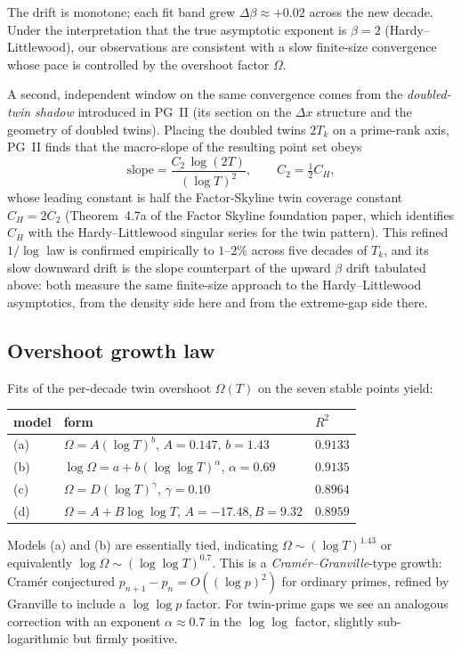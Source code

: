\documentclass[11pt]{article}
\begin{document}
The drift is monotone; each fit band grew $\Delta\beta\approx+0.02$
across the new decade. Under the interpretation that the true
asymptotic exponent is $\beta=2$ (Hardy--Littlewood), our observations
are consistent with a slow finite-size convergence whose pace is
controlled by the overshoot factor
$\Omega$.

A second, independent window on the same convergence comes from the
\emph{doubled-twin shadow} introduced in PG~II (its section on the
$\Delta x$ structure and the geometry of doubled twins). Placing the
doubled twins $2T_k$ on a prime-rank axis, PG~II finds that the
macro-slope of the resulting point set obeys
\[
   \mathrm{slope}=\frac{C_2\,\log(2T)}{(\log T)^2},
   \qquad C_2=\tfrac12 C_H,
\]
whose leading constant is half the Factor-Skyline twin coverage
constant $C_H=2C_2$ (Theorem~4.7a of the Factor Skyline foundation
paper, which identifies $C_H$ with the Hardy--Littlewood singular
series for the twin pattern). This refined $1/\log$ law is confirmed
empirically to $1$--$2\%$ across five decades of $T_k$, and its slow
downward drift is the slope counterpart of the upward $\beta$ drift
tabulated above: both measure the same finite-size approach to the
Hardy--Littlewood asymptotics, from the density side here and from the
extreme-gap side there.

\subsection{Overshoot growth law}

Fits of the per-decade twin overshoot
$\Omega(T)$ on the seven stable points yield:
\begin{center}
\begin{tabular}{lll}
\toprule
model & form & $R^2$ \\
\midrule
(a) & $\Omega=A(\log T)^b$, $A=0.147,\,b=1.43$ & $0.9133$ \\
(b) & $\log\Omega=a+b(\log\log T)^\alpha$, $\alpha=0.69$ & $0.9135$ \\
(c) & $\Omega=D(\log T)^\gamma$, $\gamma=0.10$ & $0.8964$ \\
(d) & $\Omega=A+B\log\log T$, $A=-17.48,B=9.32$ & $0.8959$ \\
\bottomrule
\end{tabular}
\end{center}

Models (a) and (b) are essentially tied, indicating
$\Omega\sim(\log T)^{1.43}$ or equivalently
$\log\Omega\sim(\log\log T)^{0.7}$. This is a
\emph{Cram\'er--Granville}-type growth: Cram\'er conjectured
$p_{n+1}-p_n=O((\log p)^2)$ for ordinary primes, refined by Granville
to include a $\log\log p$ factor. For twin-prime gaps we see an
analogous correction with an exponent $\alpha\approx 0.7$ in the
$\log\log$ factor, slightly sub-logarithmic but firmly positive.
\end{document}
